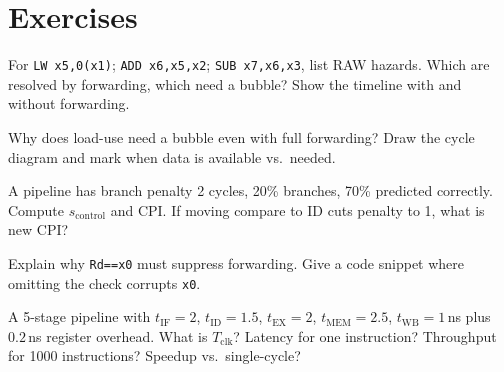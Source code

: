 \section{Exercises}
\begin{exercise}For \texttt{LW x5,0(x1)}; \texttt{ADD x6,x5,x2}; \texttt{SUB x7,x6,x3}, list RAW hazards. Which are resolved by forwarding, which need a bubble? Show the timeline with and without forwarding.\end{exercise}
\begin{exercise}Why does load-use need a bubble even with full forwarding? Draw the cycle diagram and mark when data is available vs.\ needed.\end{exercise}
\begin{exercise}A pipeline has branch penalty 2 cycles, 20\% branches, 70\% predicted correctly. Compute $s_{\text{control}}$ and CPI. If moving compare to ID cuts penalty to 1, what is new CPI?\end{exercise}
\begin{exercise}Explain why \texttt{Rd==x0} must suppress forwarding. Give a code snippet where omitting the check corrupts \texttt{x0}.\end{exercise}
\begin{exercise}A 5-stage pipeline with $t_{\text{IF}}=2$, $t_{\text{ID}}=1.5$, $t_{\text{EX}}=2$, $t_{\text{MEM}}=2.5$, $t_{\text{WB}}=1$\,ns plus $0.2$\,ns register overhead. What is $T_{\text{clk}}$? Latency for one instruction? Throughput for 1000 instructions? Speedup vs.\ single-cycle?\end{exercise}

